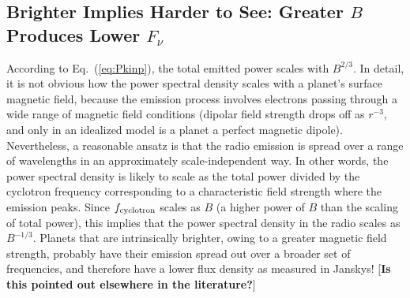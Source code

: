 \documentclass{emulateapj}
\def\memoDS#1{\color{blue}$[${\bf #1}$]$ \color{black}}
\begin{document}



\subsection{Brighter Implies Harder to See: Greater $B$ Produces Lower $F_\nu$}
\label{ss:counterintuitive}

According to Eq.~(\ref{eq:Pkinp}), the total emitted power scales with $B^{2/3}$.
In detail, it is not obvious how the power spectral density scales with a planet's surface magnetic field, because the emission process involves electrons passing through a wide range of magnetic field conditions (dipolar field strength drops off as $r^{-3}$, and only in an idealized model is a planet a perfect magnetic dipole).
Nevertheless, a reasonable ansatz is that the radio emission is spread over a range of wavelengths in an approximately scale-independent way.
In other words, the power spectral density is likely to scale as the total power divided by the cyclotron frequency corresponding to a characteristic field strength where the emission peaks.
Since $f_{\rm cyclotron}$ scales as $B$ (a higher power of $B$ than the scaling of total power), this implies that the power spectral density in the radio scales as $B^{-1/3}$.
Planets that are intrinsically brighter, owing to a greater magnetic field strength, probably have their emission spread out over a broader set of frequencies, and therefore have a lower flux density as measured in Janskys!
\memoDS{Is this pointed out elsewhere in the literature?}
\end{document}
